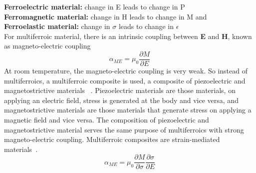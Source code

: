 \documentclass[12pt,a4paper,bold]{thesis}
\theoremstyle{thm}
\theoremstyle{definition}
\begin{document}
\textbf{Ferroelectric material:} change in E leads to change in P\\
\textbf{Ferromagnetic material:} change in H leads to change in M and\\
\textbf{Ferroelastic material:} change in $\sigma$ leads to change in $\epsilon$\\
For multiferroic material, there is an intrinsic coupling between \textbf{E} and \textbf{H}, known as magneto-electric coupling
\[\alpha_{ME}=\mu_0\frac{\partial M}{\partial E}\]
\indent\indent At room temperature, the magneto-electric coupling is very weak. So instead of multiferroics, a multiferroic composite is used, a composite of piezoelectric and magnetostrictive materials ~\cite{RefWorks:165,RefWorks:842}. Piezoelectric materials are those materials, on applying an electric field, stress is generated at the body and vice versa, and magnetostrictive materials are those materials that generate stress on applying a magnetic field and vice versa. The composition of piezoelectric and magnetostrictive material serves the same purpose of multiferroics with strong magneto-electric coupling. Multiferroic composites are strain-mediated materials~\cite{roy15_2}.
\[\alpha_{ME}=\mu_0\frac{\partial M}{\partial \sigma}\frac{\partial \sigma}{\partial E}\] 
\end{document}
